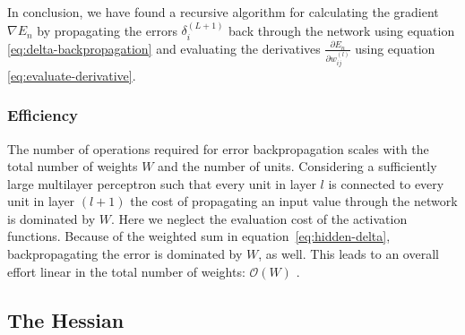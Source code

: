 In conclusion, we have found a recursive algorithm for calculating the gradient $\nabla E_n$ by propagating the errors $\delta _i ^{(L+1)}$ back through the network using equation \eqref{eq:delta-backpropagation} and evaluating the derivatives $\frac{\partial E_n}{\partial w_{ij}^{(l)}}$ using equation \eqref{eq:evaluate-derivative}.


\subsubsection{Efficiency}

The number of operations required for error backpropagation scales with the total number of weights $W$ and the number of units. Considering a sufficiently large multilayer perceptron such that every unit in layer $l$ is connected to every unit in layer $(l+1)$ the cost of propagating an input value through the network is dominated by $W$. Here we neglect the evaluation cost of the activation functions. Because of the weighted sum in equation~\eqref{eq:hidden-delta}, backpropagating the error is dominated by $W$, as well. This leads to an overall effort linear in the total number of weights: $\mathcal{O}(W)$ \cite[p.~246-247]{Bishop:2006}.

\subsection{The Hessian}


